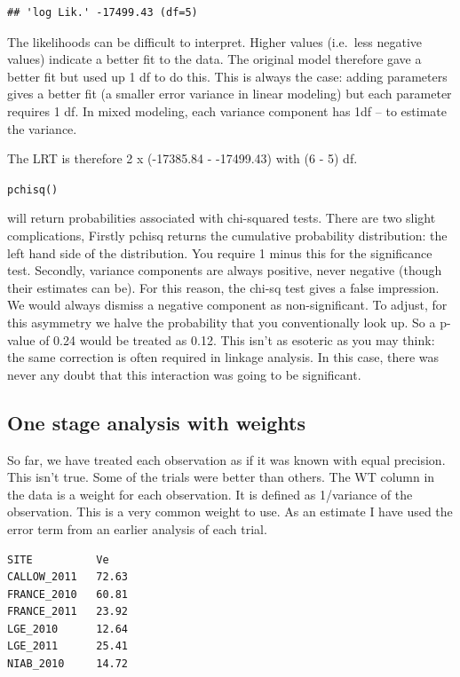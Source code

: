\documentclass[
]{book}
\begin{document}
\begin{verbatim}
## 'log Lik.' -17499.43 (df=5)
\end{verbatim}

The likelihoods can be difficult to interpret. Higher values (i.e.~less negative values) indicate a better fit to the data. The original model therefore gave a better fit but used up 1 df to do this. This is always the case: adding parameters gives a better fit (a smaller error variance in linear modeling) but each parameter requires 1 df. In mixed modeling, each variance component has 1df -- to estimate the variance.

The LRT is therefore 2 x (-17385.84 - -17499.43) with (6 - 5) df.

\texttt{pchisq()}

will return probabilities associated with chi-squared tests. There are two slight complications, Firstly pchisq returns the cumulative probability distribution: the left hand side of the distribution. You require 1 minus this for the significance test. Secondly, variance components are always positive, never negative (though their estimates can be). For this reason, the chi-sq test gives a false impression. We would always dismiss a negative component as non-significant. To adjust, for this asymmetry we halve the probability that you conventionally look up. So a p-value of 0.24 would be treated as 0.12. This isn't as esoteric as you may think: the same correction is often required in linkage analysis. In this case, there was never any doubt that this interaction was going to be significant.

\hypertarget{one-stage-analysis-with-weights}{%
\subsection{One stage analysis with weights}\label{one-stage-analysis-with-weights}}

So far, we have treated each observation as if it was known with equal precision. This isn't true. Some of the trials were better than others. The WT column in the data is a weight for each observation. It is defined as 1/variance of the observation. This is a very common weight to use. As an estimate I have used the error term from an earlier analysis of each trial.

\begin{verbatim}
SITE          Ve
CALLOW_2011   72.63
FRANCE_2010   60.81
FRANCE_2011   23.92
LGE_2010      12.64
LGE_2011      25.41
NIAB_2010     14.72
\end{verbatim}
\end{document}
